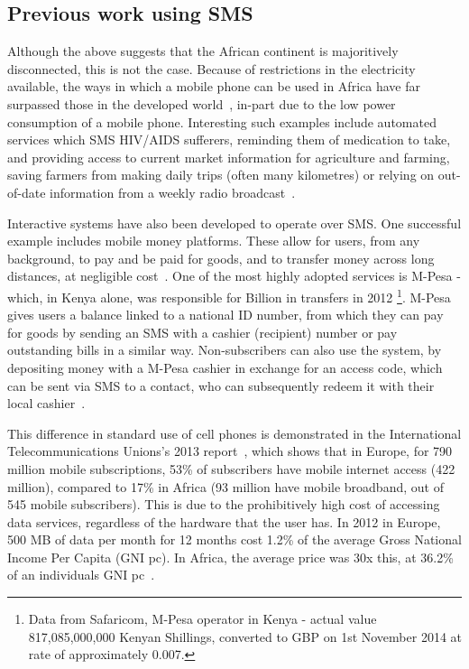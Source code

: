\documentclass{article}
\begin{document}
\subsection{Previous work using SMS}
Although the above suggests that the African continent is majoritively disconnected, this is not the case.  Because of restrictions in the electricity available, the ways in which a mobile phone can be used in Africa have far surpassed those in the developed world~\cite{Fox:2011:Online}, in-part due to the low power consumption of a mobile phone.  Interesting such examples include automated services which SMS HIV/AIDS sufferers, reminding them of medication to take, and providing access to current market information for agriculture and farming, saving farmers from making daily trips (often many kilometres) or relying on out-of-date information from a weekly radio broadcast~\cite{Aker_Mobile_Phones_2010}.

Interactive systems have also been developed to operate over SMS.  One successful example includes mobile money platforms.  These allow for users, from any background, to pay and be paid for goods, and to transfer money across long distances, at negligible cost~\cite{Aker_Mobile_Phones_2010}.  One of the most highly adopted services is M-Pesa - which, in Kenya alone, was responsible for  Billion in transfers in 2012 \footnote{Data from Safaricom, M-Pesa operator in Kenya - actual value 817,085,000,000 Kenyan Shillings, converted to GBP on 1st November 2014 at rate of approximately 0.007.}.  M-Pesa gives users a balance linked to a national ID number, from which they can pay for goods by sending an SMS with a cashier (recipient) number or pay outstanding bills in a similar way.  Non-subscribers can also use the system, by depositing money with a M-Pesa cashier in exchange for an access code, which can be sent via SMS to a contact, who can subsequently redeem it with their local cashier~\cite{Aker_Mobile_Phones_2010}.

This difference in standard use of cell phones is demonstrated in the International Telecommunications Unions's 2013 report~\cite{ITU_Cell_Usage_2013}, which shows that in Europe, for 790 million mobile subscriptions, 53\% of subscribers have mobile internet access (422 million), compared to 17\% in Africa (93 million have mobile broadband, out of 545 mobile subscribers).  This is due to the prohibitively high cost of accessing data services, regardless of the hardware that the user has.  In 2012 in Europe, 500 MB of data per month for 12 months cost 1.2\% of the average Gross National Income Per Capita (GNI pc).  In Africa, the average price was 30x this, at 36.2\% of an individuals GNI pc~\cite{ITU_Information_Society_2013}.
\end{document}
